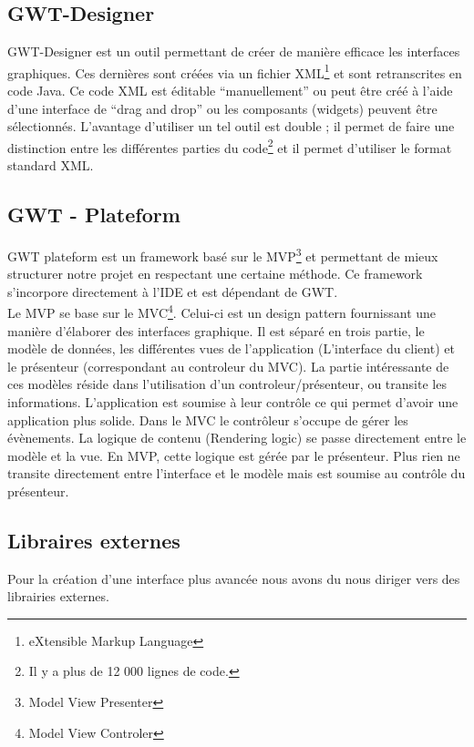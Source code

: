 \subsection{GWT-Designer}
GWT-Designer est un outil permettant de créer de manière efficace les interfaces graphiques. Ces dernières sont créées via un fichier XML\footnote{eXtensible Markup Language} et sont retranscrites en code Java. 
\newline
\indent
Ce code XML est éditable \enquote{manuellement} ou peut être créé à l'aide d'une interface de \enquote{drag and drop} ou les composants (widgets) peuvent être sélectionnés.
\newline
\indent
L'avantage d'utiliser un tel outil est double ; il permet de faire une distinction entre les différentes parties du code\footnote{Il y a plus de 12 000 lignes de code.} et il permet d'utiliser le format standard XML.

\subsection{GWT - Plateform}
GWT plateform est un framework basé sur le MVP\footnote{Model View Presenter} et permettant de mieux structurer notre projet en respectant une certaine méthode. Ce framework s'incorpore directement à l'IDE et est dépendant de GWT.\\
\newline
\indent
Le MVP se base sur le MVC\footnote{Model View Controler}. Celui-ci est un design pattern fournissant une manière d'élaborer des interfaces graphique. Il est séparé en trois partie, le modèle de données, les différentes vues de l'application (L'interface du client) et le présenteur (correspondant au controleur du MVC). La partie intéressante de ces modèles réside dans l'utilisation d'un controleur/présenteur, ou transite les informations. L'application est soumise à leur contrôle ce qui permet d'avoir une application plus solide. Dans le MVC le contrôleur s'occupe de gérer les évènements. La logique de contenu (Rendering logic) se passe directement entre le modèle et la vue. En MVP, cette logique est gérée par le présenteur. Plus rien ne transite directement entre l'interface et le modèle mais est soumise au contrôle du présenteur.

\subsection{Libraires externes}
Pour la création d'une interface plus avancée nous avons du nous diriger vers des librairies externes. 
